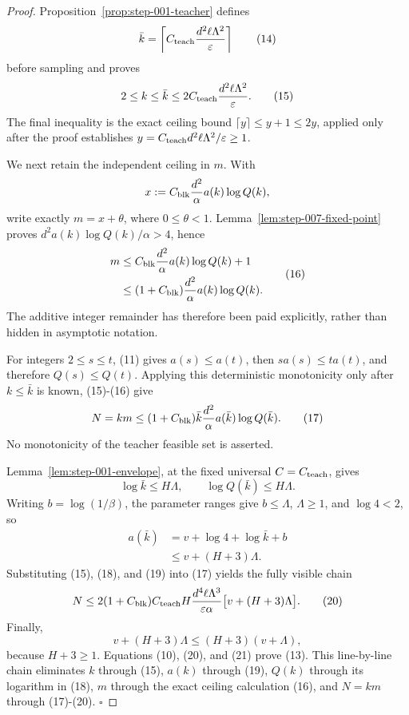 \begin{proof}
Proposition~\ref{prop:step-001-teacher} defines
\[
 \bar k
 =
 \left\lceil
 C_{\rm teach}\frac{d^2\ell\Lambda^2}{\varepsilon}
 \right\rceil
\tag{14}
\]
before sampling and proves
\[
 2\leq k\leq\bar k
 \leq
 2C_{\rm teach}\frac{d^2\ell\Lambda^2}{\varepsilon}.
\tag{15}
\]
The final inequality is the exact ceiling bound
\(\lceil y\rceil\leq y+1\leq2y\), applied only after the  proof
establishes
\(y=C_{\rm teach}d^2\ell\Lambda^2/\varepsilon\geq1\).

We next retain the independent ceiling in \(m\). With
\[
 x:=C_{\rm blk}\frac{d^2}{\alpha}a(k)\log Q(k),
\]
write exactly \(m=x+\theta\), where \(0\leq\theta<1\). Lemma~\ref{lem:step-007-fixed-point} proves
\(d^2a(k)\log Q(k)/\alpha>4\), hence
\[
\begin{aligned}
 m
 &\leq
 C_{\rm blk}\frac{d^2}{\alpha}a(k)\log Q(k)+1\\
 &\leq
 (1+C_{\rm blk})\frac{d^2}{\alpha}a(k)\log Q(k).
\end{aligned}
\tag{16}
\]
The additive integer remainder has therefore been paid explicitly, rather
than hidden in asymptotic notation.

For integers \(2\leq s\leq t\), (11) gives
\(a(s)\leq a(t)\), then \(sa(s)\leq ta(t)\), and therefore
\(Q(s)\leq Q(t)\). Applying this deterministic monotonicity only after
\(k\leq\bar k\) is known, (15)-(16) give
\[
 N=km
 \leq
 (1+C_{\rm blk})\bar k\frac{d^2}{\alpha}
 a(\bar k)\log Q(\bar k).
\tag{17}
\]
No monotonicity of the teacher feasible set is asserted.

Lemma~\ref{lem:step-001-envelope}, at the fixed universal
\(C=C_{\rm teach}\), gives
\[
 \log\bar k\leq H\Lambda,
 \qquad
 \log Q(\bar k)\leq H\Lambda.
\tag{18}
\]
Writing \(b=\log(1/\beta)\), the parameter ranges give
\(b\leq\Lambda\), \(\Lambda\geq1\), and \(\log4<2\), so
\[
\begin{aligned}
 a(\bar k)
 &=v+\log4+\log\bar k+b\\
 &\leq v+(H+3)\Lambda.
\end{aligned}
\tag{19}
\]
Substituting (15), (18), and (19) into (17) yields the fully visible chain
\[
 N
 \leq
 2(1+C_{\rm blk})C_{\rm teach}H
 \frac{d^4\ell\Lambda^3}{\varepsilon\alpha}
 \bigl[v+(H+3)\Lambda\bigr].
\tag{20}
\]
Finally,
\[
 v+(H+3)\Lambda\leq(H+3)(v+\Lambda),
\tag{21}
\]
because \(H+3\geq1\). Equations (10), (20), and (21) prove (13).
This line-by-line chain eliminates \(k\) through (15), \(a(k)\) through
(19), \(Q(k)\) through its logarithm in (18), \(m\) through the exact
ceiling calculation (16), and \(N=km\) through (17)-(20). \(\square\)


\end{proof}

